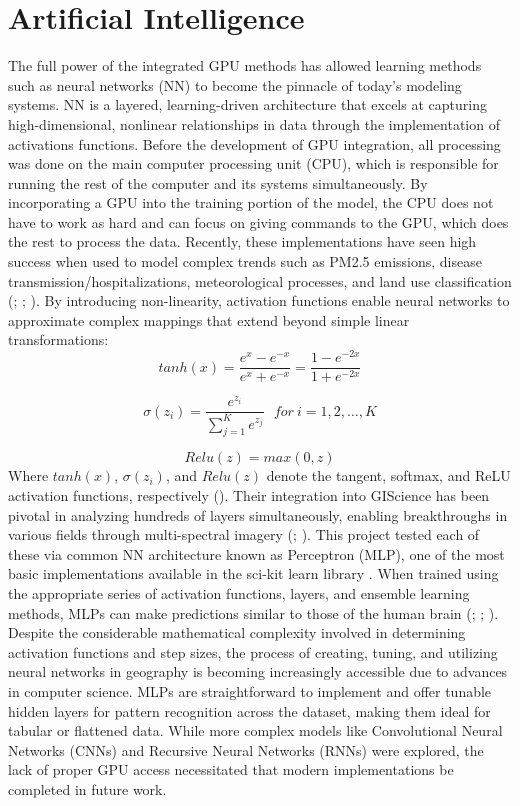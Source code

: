 \section{Artificial Intelligence} \label{litreview:ai} The full power of the integrated GPU methods has allowed learning methods such as neural networks (NN) to become the pinnacle of today’s modeling systems. NN is a layered, learning-driven architecture that excels at capturing high-dimensional, nonlinear relationships in data through the implementation of activations functions. Before the development of GPU integration, all processing was done on the main computer processing unit (CPU), which is responsible for running the rest of the computer and its systems simultaneously. By incorporating a GPU into the training portion of the model, the CPU does not have to work as hard and can focus on giving commands to the GPU, which does the rest to process the data. Recently, these implementations have seen high success when used to model complex trends such as PM2.5 emissions, disease transmission/hospitalizations, meteorological processes, and land use classification (\cite{acciani_neural_2006}; \cite{kleinert_intellio3-ts_2020}; \cite{gao_simulation_2021}). By introducing non-linearity, activation functions enable neural networks to approximate complex mappings that extend beyond simple linear transformations: 
\[tanh(x) = \frac{e^x - e^{-x}}{e^x + e^{-x}} = \frac{1 - e^{-2x}}{1 + e^{-2x}}\]

\[\sigma(z_i) = \frac{e^{z_{i}}}{\sum_{j=1}^K e^{z_{j}}} \ \ \ for\ i=1,2,\dots,K\]

\[Relu(z) = max(0, z)\]
Where $tanh(x)$, $\sigma(z_i)$, and $Relu(z)$ denote the tangent, softmax, and ReLU activation functions, respectively (\cite{alzubaidi_review_2021}). Their integration into GIScience has been pivotal in analyzing hundreds of layers simultaneously, enabling breakthroughs in various fields through multi-spectral imagery (\cite{janowicz2020}; \cite{paoletti2019}). This project tested each of these via common NN architecture known as Perceptron (MLP), one of the most basic implementations available in the sci-kit learn library \cite{buitinck_api_2013}. When trained using the appropriate series of activation functions, layers, and ensemble learning methods, MLPs can make predictions similar to those of the human brain (\cite{chen_geo-sto3net_2024}; \cite{gao_simulation_2021}; \cite{li_development_2024}). Despite the considerable mathematical complexity involved in determining activation functions and step sizes, the process of creating, tuning, and utilizing neural networks in geography is becoming increasingly accessible due to advances in computer science. MLPs are straightforward to implement and offer tunable hidden layers for pattern recognition across the dataset, making them ideal for tabular or flattened data. While more complex models like Convolutional Neural Networks (CNNs) and Recursive Neural Networks (RNNs) were explored, the lack of proper GPU access necessitated that modern implementations be completed in future work. 
